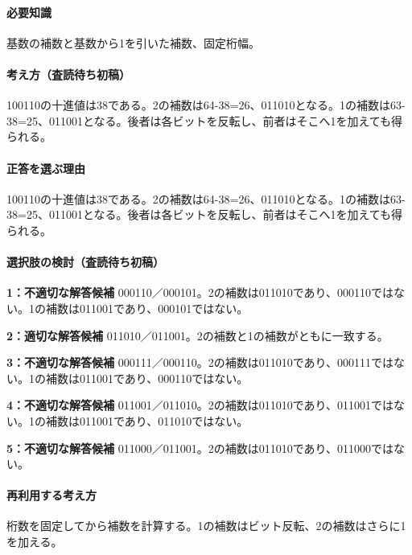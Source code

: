 \paragraph{必要知識} 基数の補数と基数から1を引いた補数、固定桁幅。

\paragraph{考え方（査読待ち初稿）} 100110の十進値は38である。2の補数は64-38=\allowbreak{}26、011010となる。1の補数は63-38=\allowbreak{}25、011001となる。後者は各ビットを反転し、前者はそこへ1を加えても得られる。

\paragraph{正答を選ぶ理由} 100110の十進値は38である。2の補数は64-38=\allowbreak{}26、011010となる。1の補数は63-38=\allowbreak{}25、011001となる。後者は各ビットを反転し、前者はそこへ1を加えても得られる。

\paragraph{選択肢の検討（査読待ち初稿）}\mbox{}\par

\noindent\textbf{1：不適切な解答候補} 000110／000101。2の補数は011010であり、000110ではない。1の補数は011001であり、000101ではない。\par

\noindent\textbf{2：適切な解答候補} 011010／011001。2の補数と1の補数がともに一致する。\par

\noindent\textbf{3：不適切な解答候補} 000111／000110。2の補数は011010であり、000111ではない。1の補数は011001であり、000110ではない。\par

\noindent\textbf{4：不適切な解答候補} 011001／011010。2の補数は011010であり、011001ではない。1の補数は011001であり、011010ではない。\par

\noindent\textbf{5：不適切な解答候補} 011000／011001。2の補数は011010であり、011000ではない。\par

\paragraph{再利用する考え方} 桁数を固定してから補数を計算する。1の補数はビット反転、2の補数はさらに1を加える。

